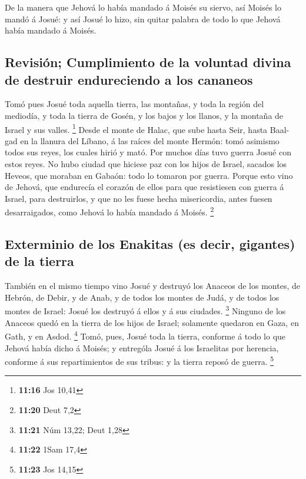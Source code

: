  De la manera que Jehová lo había mandado á Moisés su
siervo, así Moisés lo mandó á Josué: y así Josué lo hizo, sin quitar
palabra de todo lo que Jehová había mandado á Moisés.

\hypertarget{revisiuxf3n-cumplimiento-de-la-voluntad-divina-de-destruir-endureciendo-a-los-cananeos}{%
\subsection{Revisión; Cumplimiento de la voluntad divina de destruir
endureciendo a los
cananeos}\label{revisiuxf3n-cumplimiento-de-la-voluntad-divina-de-destruir-endureciendo-a-los-cananeos}}

 Tomó pues Josué toda aquella tierra, las montañas, y toda
la región del mediodía, y toda la tierra de Gosén, y los bajos y los
llanos, y la montaña de Israel y sus valles. \footnote{\textbf{11:16}
  Jos 10,41}  Desde el monte de Halac, que sube hasta Seir,
hasta Baal-gad en la llanura del Líbano, á las raíces del monte Hermón:
tomó asimismo todos sus reyes, los cuales hirió y mató. 
Por muchos días tuvo guerra Josué con estos reyes.  No hubo
ciudad que hiciese paz con los hijos de Israel, sacados los Heveos, que
moraban en Gabaón: todo lo tomaron por guerra.  Porque esto
vino de Jehová, que endurecía el corazón de ellos para que resistiesen
con guerra á Israel, para destruirlos, y que no les fuese hecha
misericordia, antes fuesen desarraigados, como Jehová lo había mandado á
Moisés. \footnote{\textbf{11:20} Deut 7,2}

\hypertarget{exterminio-de-los-enakitas-es-decir-gigantes-de-la-tierra}{%
\subsection{Exterminio de los Enakitas (es decir, gigantes) de la
tierra}\label{exterminio-de-los-enakitas-es-decir-gigantes-de-la-tierra}}

 También en el mismo tiempo vino Josué y destruyó los
Anaceos de los montes, de Hebrón, de Debir, y de Anab, y de todos los
montes de Judá, y de todos los montes de Israel: Josué los destruyó á
ellos y á sus ciudades. \footnote{\textbf{11:21} Núm 13,22; Deut 1,28}
 Ninguno de los Anaceos quedó en la tierra de los hijos de
Israel; solamente quedaron en Gaza, en Gath, y en Asdod. \footnote{\textbf{11:22}
  1Sam 17,4}  Tomó, pues, Josué toda la tierra, conforme á
todo lo que Jehová había dicho á Moisés; y entrególa Josué á los
Israelitas por herencia, conforme á sus repartimientos de sus tribus: y
la tierra reposó de guerra. \footnote{\textbf{11:23} Jos 14,15}

